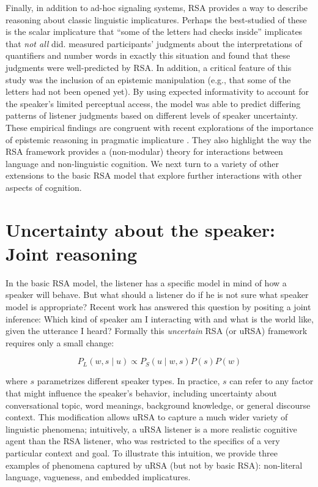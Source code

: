 \documentclass[]{elsarticle}
\begin{document}
Finally, in addition to ad-hoc signaling systems, RSA provides a way to describe reasoning about classic linguistic
implicatures. Perhaps the
best-studied of these is the scalar implicature that ``some of the
letters had checks inside'' implicates that \emph{not all} did. \citet{goodman2013} measured participants' judgments about the
interpretations of quantifiers and number words in exactly this
situation and found that these judgments were well-predicted by RSA. In
addition, a critical feature of this study was the inclusion of an
epistemic manipulation (e.g., that some of the letters had not been opened
yet). By using expected informativity to account for the speaker's
limited perceptual access, the model was able to predict
differing patterns of listener judgments based on different levels of
speaker uncertainty. These empirical findings are congruent with recent
explorations of the importance of epistemic reasoning in pragmatic
implicature \citep[e.g.,]{bergen2012,breheny2013}. They
also highlight the way the RSA framework provides a (non-modular) theory
for interactions between language and non-linguistic cognition. We next turn to a variety of other extensions to the basic RSA model that explore further interactions with other aspects of cognition.

\section{Uncertainty about the speaker: Joint reasoning}\label{uncertainty-about-the-speaker-joint-reasoning}

In the basic RSA model, the listener has a specific model in mind of how
a speaker will behave. But what should a listener do if he is not sure
what speaker model is appropriate? Recent work has answered this
question by positing a joint inference: Which kind of speaker am I
interacting with and what is the world like, given the utterance I
heard? Formally this \emph{uncertain} RSA (or uRSA) framework requires
only a small change:

$$P_L(w,s\mid u) \propto
P_S(u\mid w,s)P(s)P(w)$$

where $s$ parametrizes different speaker types. In practice, $s$ can
refer to any factor that might influence the speaker's behavior,
including uncertainty about conversational topic, word
meanings, background knowledge, or general discourse context.
This modification allows uRSA to capture a much wider variety of
linguistic phenomena; intuitively, a uRSA listener is a more realistic
cognitive agent than the RSA listener, who was restricted to the
specifics of a very particular context and goal. To illustrate this
intuition, we provide three examples of phenomena captured by uRSA (but not by basic RSA): non-literal language, vagueness, and embedded implicatures.
\end{document}
